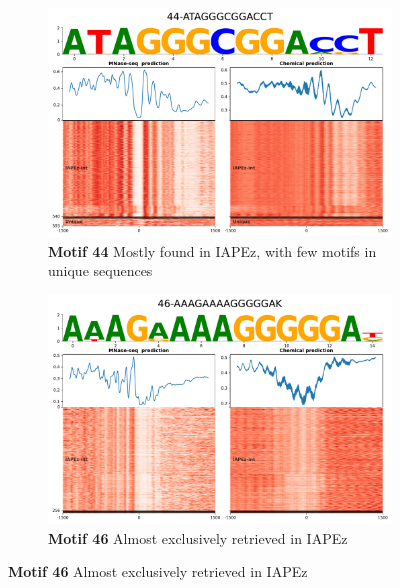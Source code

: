 \documentclass[11pt]{book}
\begin{document}
\begin{figure}[htbp]
    \centering
    \begin{subfigure}{0.48\textwidth}
        \centering
        \includegraphics[width=\linewidth]{Figures/Results/xstreme_onrep_meta_hm/44-ATAGGGCGGACCT.pdf}
        \caption{\textbf{Motif 44} Mostly found in IAPEz, with few motifs in unique sequences}
        \label{fig:xstreme44_ltr}
    \end{subfigure}\hfill
    \begin{subfigure}{0.48\textwidth}
        \centering
        \includegraphics[width=\linewidth]{Figures/Results/xstreme_onrep_meta_hm/46-AAAGAAAAGGGGGAK.pdf}
        \caption{\textbf{Motif 46} Almost exclusively retrieved in IAPEz}
        \label{fig:xstreme46_ltr}
    \end{subfigure}


\end{figure}
\end{document}
